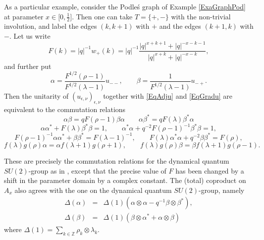 \documentclass[10pt]{article}
\newcommand{\Z}{\mathbb{Z}}
\theoremstyle{definition}
\numberwithin{equation}{section}
\begin{document}
As a particular example, consider the Podle\'{s} graph of Example \ref{ExaGraphPod} at parameter $x\in \lbrack 0,\frac{1}{2}\rbrack$. Then one can take $T = \{+,-\}$ with the non-trivial involution, and label the edges $(k,k+1)$ with $+$ and the edges $(k+1,k)$ with $-$. Let us write \[F(k) = |q|^{-1}w_+(k) =  |q|^{-1}\frac{|q|^{x+k+1}+|q|^{-x-k-1}}{|q|^{x+k}+|q|^{-x-k}},\] and further put\[\alpha = \frac{F^{1/2}(\rho-1)}{F^{1/2}(\lambda-1)}u_{--},\qquad \beta = \frac{1}{F^{1/2}(\lambda-1)}u_{-+}.\] Then the unitarity of $(u_{\epsilon,\nu})_{\epsilon,\nu}$ together with \eqref{EqAdju} and \eqref{EqGradu} are equivalent to the commutation relations \begin{equation}\label{EqqCom} \alpha \beta = qF(\rho-1)\beta\alpha \qquad \alpha\beta^* = qF(\lambda)\beta^*\alpha\end{equation} \begin{equation}\label{EqDet} \alpha\alpha^* +F(\lambda)\beta^*\beta = 1,\qquad \alpha^*\alpha+q^{-2}F(\rho-1)^{-1}\beta^*\beta = 1,\end{equation}\begin{equation*} F(\rho-1)^{-1}\alpha\alpha^* +\beta\beta^* = F(\lambda-1)^{-1},\qquad  F(\lambda)\alpha^*\alpha +q^{-2}\beta\beta^* = F(\rho),\end{equation*} \begin{equation}\label{EqGrad} f(\lambda)g(\rho)\alpha =
\alpha f(\lambda+1)g(\rho+1),\qquad f(\lambda)g(\rho)\beta = \beta f(\lambda+1)g(\rho-1).\end{equation}%

These are precisely the commutation relations for the dynamical quantum $SU(2)$-group as in \cite[Definition 2.6]{KoR1}, except that the precise value of $F$ has been changed by a shift in the parameter domain by a complex constant. The (total) coproduct on $A_x$ also agrees with the one on the dynamical quantum $SU(2)$-group, namely \begin{eqnarray*} \Delta(\alpha) &=& \Delta(1) (\alpha\otimes \alpha - q^{-1}\beta\otimes \beta^*),\\ \Delta(\beta) &=& \Delta(1)(\beta\otimes \alpha^* +\alpha\otimes \beta)\end{eqnarray*} where $\Delta(1) = \sum_{k\in \Z} \rho_k\otimes \lambda_k$.




%
%

\end{document}
